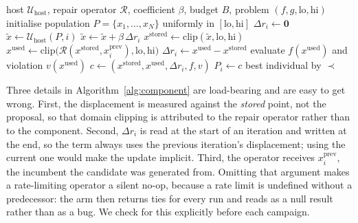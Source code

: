 \documentclass[11pt,a4paper]{article}
\begin{document}
\begin{algorithm}[htbp]
\caption{Displacement reuse as a host-agnostic component. $\mathcal{U}_{\text{host}}$ is
the host's unmodified proposal rule; $\mathcal{R}$ is the repair operator; $\prec$ is the
host's own feasibility-aware comparison. The quantity $\Delta r$ is the only state the
component adds, one vector per individual.}
\label{alg:component}
\begin{algorithmic}[1]
\Require host $\mathcal{U}_{\text{host}}$, repair operator $\mathcal{R}$, coefficient
  $\beta$, budget $B$, problem $(f, g, \text{lo}, \text{hi})$
\State initialise population $P = \{x_1,\dots,x_N\}$ uniformly in $[\text{lo},\text{hi}]$
  \State $\Delta r_i \gets \mathbf{0}$
\EndFor
{}
    \State $\tilde{x} \gets \mathcal{U}_{\text{host}}(P, i)$
    \State $\tilde{x} \gets \tilde{x} + \beta\,\Delta r_i$
        \label{line:term}
    \State $x^{\text{stored}} \gets \mathrm{clip}(\tilde{x}, \text{lo}, \text{hi})$
    \State $x^{\text{used}} \gets \mathrm{clip}\big(\mathcal{R}(x^{\text{stored}},
           x^{\text{prev}}_i), \text{lo}, \text{hi}\big)$
    \State $\Delta r_i \gets x^{\text{used}} - x^{\text{stored}}$
    \State evaluate $f(x^{\text{used}})$ and violation $v(x^{\text{used}})$
    \State $c \gets (x^{\text{stored}}, x^{\text{used}}, \Delta r_i, f, v)$
      \State $P_i \gets c$
    \EndIf
  \EndFor
\EndWhile
\State \Return best individual by $\prec$
\end{algorithmic}
\end{algorithm}

Three details in Algorithm~\ref{alg:component} are load-bearing and are easy to get wrong.
First, the displacement is measured against the \emph{stored} point, not the proposal, so
that domain clipping is attributed to the repair operator rather than to the component.
Second, $\Delta r_i$ is read at the start of an iteration and written at the end, so the
term always uses the previous iteration's displacement; using the current one would make
the update implicit. Third, the operator receives $x^{\text{prev}}_i$, the incumbent the
candidate was generated from. Omitting that argument makes a rate-limiting operator a
silent no-op, because a rate limit is undefined without a predecessor: the arm then
returns ties for every run and reads as a null result rather than as a bug. We check for
this explicitly before each campaign.
\end{document}
